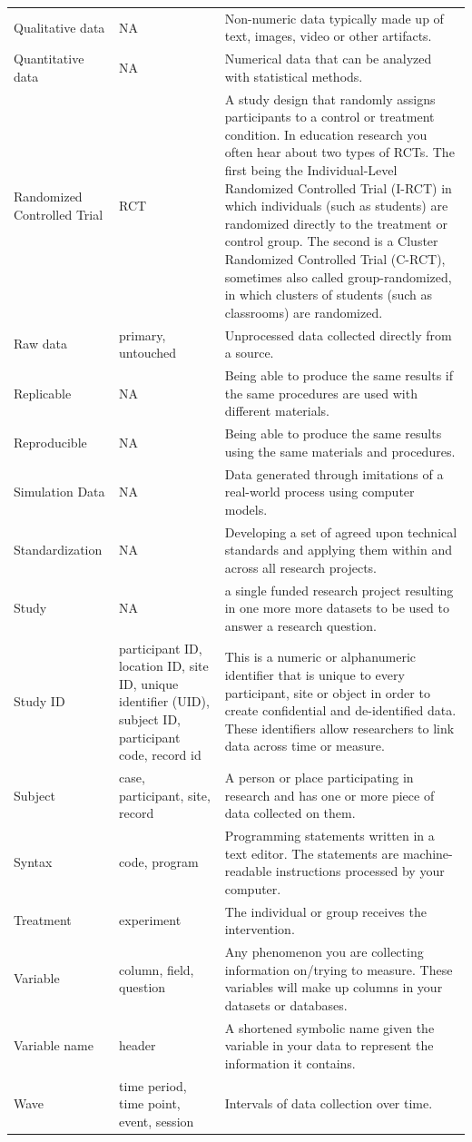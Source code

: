\documentclass[
]{book}
\begin{document}
\begin{longtable}{lll}
Qualitative data & NA & Non-numeric data typically made up of text, images, video or other artifacts. \\ 
Quantitative data & NA & Numerical data that can be analyzed with statistical methods. \\ 
Randomized Controlled Trial & RCT & A study design that randomly assigns participants to a control or treatment condition. In education research you often hear about two types of RCTs. The first being the Individual-Level Randomized Controlled Trial (I-RCT) in which individuals (such as students) are randomized directly to the treatment or control group. The second is a Cluster Randomized Controlled Trial (C-RCT), sometimes also called group-randomized, in which clusters of students (such as classrooms) are randomized. \\ 
Raw data & primary, untouched & Unprocessed data collected directly from a source. \\ 
Replicable & NA & Being able to produce the same results if the same procedures are used with different materials. \\ 
Reproducible & NA & Being able to produce the same results using the same materials and procedures. \\ 
Simulation Data & NA & Data generated through imitations of a real-world process using computer models. \\ 
Standardization & NA & Developing a set of agreed upon technical standards and applying them within and across all research projects. \\ 
Study & NA & a single funded research project resulting in one more more datasets to be used to answer a research question. \\ 
Study ID & participant ID, location ID, site ID, unique identifier (UID), subject ID, participant code, record id & This is a numeric or alphanumeric identifier that is unique to every participant, site or object in order to create confidential and de-identified data. These identifiers allow researchers to link data across time or measure. \\ 
Subject & case, participant, site, record & A person or place participating in research and has one or more piece of data collected on them. \\ 
Syntax & code, program & Programming statements written in a text editor. The statements are machine-readable instructions processed by your computer. \\ 
Treatment & experiment & The individual or group receives the intervention. \\ 
Variable & column, field, question & Any phenomenon you are collecting information on/trying to measure. These variables will make up columns in your datasets or databases. \\ 
Variable name & header & A shortened symbolic name given the variable in your data to represent the information it contains. \\ 
Wave & time period, time point, event, session & Intervals of data collection over time. \\ 
\bottomrule
\end{longtable}
\end{document}
